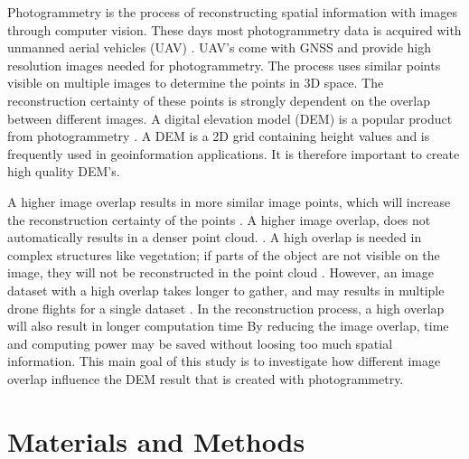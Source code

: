 \documentclass{isprs} %
\begin{document}
Photogrammetry is the process of reconstructing spatial information with images through computer vision. 
These days most photogrammetry data is acquired with unmanned aerial vehicles (UAV) \citet{UAVAreMoreUsed}. 
UAV's come with GNSS and provide high resolution images needed for photogrammetry.
The process uses similar points visible on multiple images to determine the points in 3D space.
The reconstruction certainty of these points is strongly dependent on the overlap between different images. 
A digital elevation model (DEM) is a popular product from photogrammetry \citet{DemIncrease1}.
A DEM is a 2D grid containing height values and is frequently used in geoinformation applications.
It is therefore important to create high quality DEM's.

A higher image overlap results in more similar image points, which will increase the reconstruction certainty of the points \citep{MoreOverMoreAcc}.
A higher image overlap, does not automatically results in a denser point cloud. \citep{EffectofUABimgcamover}. 
A high overlap is needed in complex structures like vegetation; if parts of the object are not visible on the image, they will not be reconstructed in the point cloud \citep{AccessingImageOverlap}.
However, an image dataset with a high overlap takes longer to gather, and may results in multiple drone flights for a single dataset \citep{UAVpopularity}.
In the reconstruction process, a high overlap will also result in longer computation time \citep{AccessingImageOverlap}
By reducing the image overlap, time and computing power may be saved without loosing too much spatial information.
This main goal of this study is to investigate how different image overlap influence the DEM result that is created with photogrammetry. 





\section{Materials and Methods}
\end{document}
